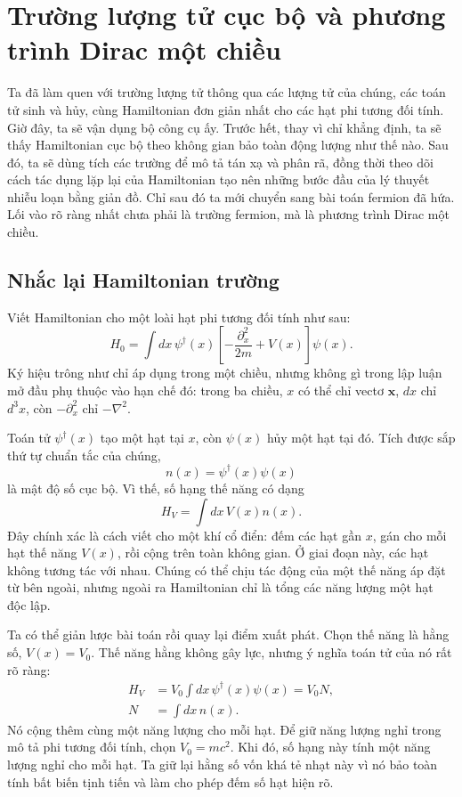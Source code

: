 \chapter{Trường lượng tử cục bộ và phương trình Dirac một chiều}

Ta đã làm quen với trường lượng tử thông qua các lượng tử của chúng, các toán tử sinh và hủy, cùng Hamiltonian đơn giản nhất cho các hạt phi tương đối tính. Giờ đây, ta sẽ vận dụng bộ công cụ ấy. Trước hết, thay vì chỉ khẳng định, ta sẽ thấy Hamiltonian cục bộ theo không gian bảo toàn động lượng như thế nào. Sau đó, ta sẽ dùng tích các trường để mô tả tán xạ và phân rã, đồng thời theo dõi cách tác dụng lặp lại của Hamiltonian tạo nên những bước đầu của lý thuyết nhiễu loạn bằng giản đồ. Chỉ sau đó ta mới chuyển sang bài toán fermion đã hứa. Lối vào rõ ràng nhất chưa phải là trường fermion, mà là phương trình Dirac một chiều.

\section{Nhắc lại Hamiltonian trường}

Viết Hamiltonian cho một loài hạt phi tương đối tính như sau:
\begin{equation}
H_0=\int dx\,
\psi^\dagger(x)
\left[-\frac{\partial_x^2}{2m}+V(x)\right]
\psi(x).
\label{eq:l9-nonrel-hamiltonian}
\end{equation}
Ký hiệu trông như chỉ áp dụng trong một chiều, nhưng không gì trong lập luận mở đầu phụ thuộc vào hạn chế đó: trong ba chiều, \(x\) có thể chỉ vectơ \(\mathbf{x}\), \(dx\) chỉ \(d^3x\), còn \(-\partial_x^2\) chỉ \(-\nabla^2\).

Toán tử \(\psi^\dagger(x)\) tạo một hạt tại \(x\), còn \(\psi(x)\) hủy một hạt tại đó. Tích được sắp thứ tự chuẩn tắc của chúng,
\begin{equation}
n(x)=\psi^\dagger(x)\psi(x)
\end{equation}
là mật độ số cục bộ. Vì thế, số hạng thế năng có dạng
\begin{equation}
H_V=\int dx\,V(x)n(x).
\end{equation}
Đây chính xác là cách viết cho một khí cổ điển: đếm các hạt gần \(x\), gán cho mỗi hạt thế năng \(V(x)\), rồi cộng trên toàn không gian. Ở giai đoạn này, các hạt không tương tác với nhau. Chúng có thể chịu tác động của một thế năng áp đặt từ bên ngoài, nhưng ngoài ra Hamiltonian chỉ là tổng các năng lượng một hạt độc lập.

Ta có thể giản lược bài toán rồi quay lại điểm xuất phát. Chọn thế năng là hằng số, \(V(x)=V_0\). Thế năng hằng không gây lực, nhưng ý nghĩa toán tử của nó rất rõ ràng:
\begin{equation}
\begin{aligned}
H_V&=V_0\int dx\,\psi^\dagger(x)\psi(x)=V_0N,\\
N&=\int dx\,n(x).
\end{aligned}
\end{equation}
Nó cộng thêm cùng một năng lượng cho mỗi hạt. Để giữ năng lượng nghỉ trong mô tả phi tương đối tính, chọn \(V_0=mc^2\). Khi đó, số hạng này tính một năng lượng nghỉ cho mỗi hạt. Ta giữ lại hằng số vốn khá tẻ nhạt này vì nó bảo toàn tính bất biến tịnh tiến và làm cho phép đếm số hạt hiện rõ.

